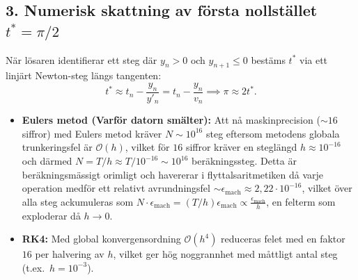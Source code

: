 \documentclass{article}
\begin{document}
\subsection*{3. Numerisk skattning av första nollstället $t^* = \pi/2$}
När lösaren identifierar ett steg där $y_n > 0$ och $y_{n+1} \le 0$ bestäms $t^*$ via ett linjärt Newton-steg längs tangenten:
\begin{equation}
    t^* \approx t_n - \frac{y_n}{y'_n} = t_n - \frac{y_n}{v_n} \implies \pi \approx 2t^*.
\end{equation}

\begin{itemize}
    \item \textbf{Eulers metod (Varför datorn smälter):}
    Att nå maskinprecision ($\sim 16$ siffror) med Eulers metod kräver $N \sim 10^{16}$ steg eftersom metodens globala trunkeringsfel är $\mathcal{O}(h)$, vilket för $16$ siffror kräver en steglängd $h \approx 10^{-16}$ och därmed $N = T/h \approx T/10^{-16} \sim 10^{16}$ beräkningssteg. Detta är beräkningsmässigt orimligt och havererar i flyttalsaritmetiken då varje operation medför ett relativt avrundningsfel $\sim \epsilon_{\text{mach}} \approx 2{,}22 \cdot 10^{-16}$, vilket över alla steg ackumuleras som $N \cdot \epsilon_{\text{mach}} = (T/h)\epsilon_{\text{mach}} \propto \frac{\epsilon_{\text{mach}}}{h}$, en felterm som exploderar då $h \to 0$.
    
    \item \textbf{RK4:}
    Med global konvergensordning $\mathcal{O}(h^4)$ reduceras felet med en faktor $16$ per halvering av $h$, vilket ger hög noggrannhet med måttligt antal steg (t.ex.\ $h = 10^{-3}$).
\end{itemize}
\end{document}
